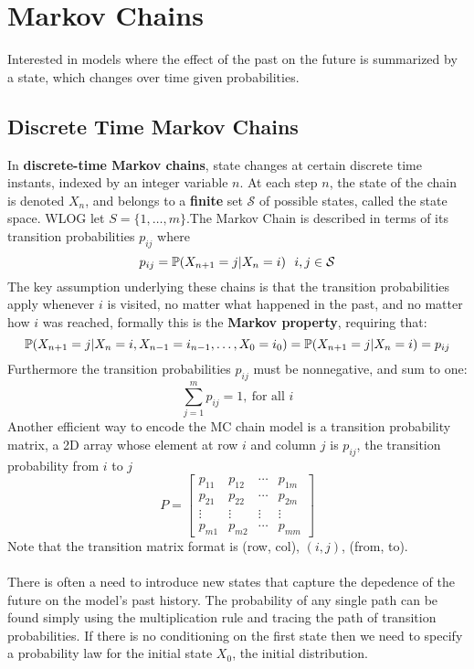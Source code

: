\documentclass[11pt]{scrartcl}
\begin{document}
\section{Markov Chains}
Interested in models where the effect of the past on the future is summarized
by a state, which changes over time given probabilities.
\subsection{Discrete Time Markov Chains}
In \textbf{discrete-time Markov chains}, state changes at certain discrete time
instants, indexed by an integer variable $n$. At each step $n$, the state of
the chain is denoted $X_{n}$, and belongs to a \textbf{finite} set $\mathcal{S}$ of
possible states, called the state space. WLOG let $S = \{1,\ldots,m\}$.The Markov Chain is described in terms
of its transition probabilities $p_{ij}$ where \[
  p_{ij} = \mathbb{P}(X_{n+1} = j | X_{n}=i) ~~ i,j \in \mathcal{S}
\] 
The key assumption underlying these chains is that the transition probabilities
apply whenever $i$ is visited, no matter what happened in the past, and no
matter how $i$ was reached, formally this is the \textbf{Markov property},
requiring that: \[
  \mathbb{P}(X_{n+1} = j | X_{n}=i, X_{n-1}=i_{n-1},\ldots,X_0=i_0) = \mathbb{P}(X_{n+1}=j
  | X_{n}=i) = p_{ij}
\] Furthermore the transition probabilities $p_{ij}$ must be nonnegative, and
sum to one: \[
  \sum_{j=1}^{m}  p_{ij} = 1, ~\text{for all }i
\] 
Another efficient way to encode the MC chain model is a transition probability
matrix, a 2D array whose element at row $i$ and column $j$ is $p_{ij}$, the
transition probability from $i$ to $j$ \[
P = \begin{bmatrix}
  p_{11} & p_{12} & \cdots & p_{1m} \\
  p_{21} & p_{22} & \cdots & p_{2m} \\
  \vdots & \vdots & \vdots & \vdots \\
  p_{m 1} & p_{m 2} & \cdots & p_{mm}
\end{bmatrix}
\] Note that the transition matrix format is (row, col), $(i,j)$, (from,
to).\\\\There is often a need to introduce new states that capture the depedence of the
future on the model's past history. The probability of any single path can be
found simply using the multiplication rule and tracing the path of transition
probabilities. If there is no conditioning on the first state then we need to
specify a probability law for the initial state $X_0$, the initial
distribution.
\end{document}
